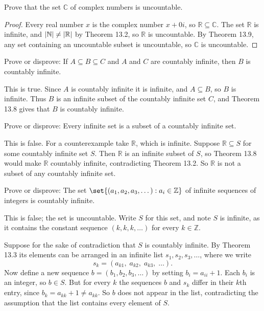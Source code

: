 \documentclass[DIN, pagenumber=false, fontsize=11pt, parskip=half]{scrartcl}
\begin{document}
\begin{problems}
    \problem Prove that the set $\mathbb{C}$ of complex numbers is uncountable.
    
    \begin{proof}
        Every real number $x$ is the complex number $x + 0i$, so $\mathbb{R} \subseteq \mathbb{C}$. The set $\mathbb{R}$ is infinite, and $\lvert \mathbb{N} \rvert \neq \lvert \mathbb{R} \rvert$ by Theorem 13.2, so $\mathbb{R}$ is uncountable. By Theorem 13.9, any set containing an uncountable subset is uncountable, so $\mathbb{C}$ is uncountable.
    \end{proof}

    \problem Prove or disprove: If $A \subseteq B \subseteq C$ and $A$ and $C$ are countably infinite, then $B$ is countably infinite.

    \answer This is true. Since $A$ is countably infinite it is infinite, and $A \subseteq B$, so $B$ is infinite. Thus $B$ is an infinite subset of the countably infinite set $C$, and Theorem 13.8 gives that $B$ is countably infinite.

    \problem Prove or disprove: Every infinite set is a subset of a countably infinite set.

    \answer This is false. For a counterexample take $\mathbb{R}$, which is infinite. Suppose $\mathbb{R} \subseteq S$ for some countably infinite set $S$. Then $\mathbb{R}$ is an infinite subset of $S$, so Theorem 13.8 would make $\mathbb{R}$ countably infinite, contradicting Theorem 13.2. So $\mathbb{R}$ is not a subset of any countably infinite set.

    \problem Prove or disprove: The set $\set{(a_1,a_2,a_3,\dots) : a_i \in \mathbb{Z}}$ of infinite sequences of integers is countably infinite.

    \answer This is false; the set is uncountable. Write $S$ for this set, and note $S$ is infinite, as it contains the constant sequence $(k,k,k,\dots)$ for every $k \in \mathbb{Z}$.

    Suppose for the sake of contradiction that $S$ is countably infinite. By Theorem 13.3 its elements can be arranged in an infinite list $s_1, s_2, s_3, \dots$, where we write
    \[
        s_k = (a_{k1},\; a_{k2},\; a_{k3},\; \dots).
    \]
    Now define a new sequence $b = (b_1, b_2, b_3, \dots)$ by setting $b_i = a_{ii} + 1$. Each $b_i$ is an integer, so $b \in S$. But for every $k$ the sequences $b$ and $s_k$ differ in their $k$th entry, since $b_k = a_{kk} + 1 \neq a_{kk}$. So $b$ does not appear in the list, contradicting the assumption that the list contains every element of $S$.


\end{problems}
\end{document}
